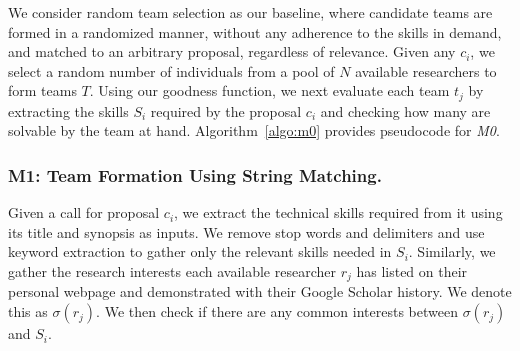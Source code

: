 We consider random team selection as our baseline, where candidate teams are formed in a randomized manner, without any adherence to the skills in demand, and matched to an arbitrary proposal, regardless of relevance. Given any $c_i$, we select a random number of individuals from a pool of $N$ available researchers to form teams $T$. Using our goodness function, we next evaluate each team $t_j$ by extracting the skills $S_i$ required by the proposal $c_i$ and checking how many are solvable by the team at hand. Algorithm~\ref{algo:m0} provides pseudocode for {\it M0}.

\subsubsection{M1: Team Formation Using String Matching.}
Given a call for proposal $c_i$, we extract the technical skills required from it using its title and synopsis as inputs. We remove stop words and delimiters and use keyword extraction to gather only the relevant skills needed in $S_i$. Similarly, we gather the research interests each available researcher $r_j$ has listed on their personal webpage and demonstrated with their Google Scholar history. We denote this as $\sigma(r_j)$. We then check if there are any common interests between $\sigma(r_j)$ and $S_i$. 


